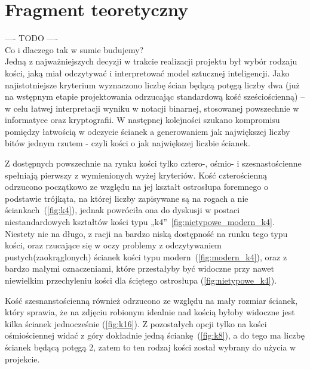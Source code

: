 \chapter{Fragment teoretyczny}\label{ch:fragment-teoretyczny}

---- TODO ---- \\

Co i dlaczego tak w sumie budujemy? \\

Jedną z najważniejszych decyzji w trakcie realizacji projektu był wybór rodzaju kości, jaką miał odczytywać 
i interpretować model sztucznej inteligencji.
Jako najistotniejsze kryterium wyznaczono liczbę ścian będącą potęgą liczby dwa
(już na wstępnym etapie projektowania odrzucając standardową kość sześciościenną) --
w celu łatwej interpretacji wyniku w notacji binarnej, stosowanej powszechnie w informatyce oraz kryptografii.
W następnej kolejności szukano kompromisu pomiędzy łatwością w odczycie ścianek a generowaniem jak największej liczby
bitów jednym rzutem - czyli kości o jak największej liczbie ścianek. 

Z dostępnych powszechnie na rynku kości tylko cztero-, ośmio- i szesnastościenne spełniają pierwszy z wymienionych wyżej kryteriów.
Kość czterościenną odrzucono początkowo ze względu na jej kształt ostrosłupa foremnego o podstawie trójkąta,
na której liczby zapisywane są na rogach a nie ściankach~(\ref{fig:k4}),
jednak powróciła ona do dyskusji w postaci niestandardowych kształtów kości typu „k4”~\ref{fig:nietypowe_modern_k4}.
Niestety nie na długo, z racji na bardzo niską dostępność na runku tego typu kości, oraz rzucające się w oczy problemy
z odczytywaniem pustych(zaokrąglonych) ścianek kości typu modern~(\ref{fig:modern_k4}),
oraz z bardzo małymi oznaczeniami, które przestałyby być widoczne przy nawet niewielkim przechyleniu kości
dla ściętego ostrosłupa (\ref{fig:nietypowe_k4}).

Kość szesnanstościenną również odrzucono ze względu na mały rozmiar ścianek, który sprawia,
że na zdjęciu robionym idealnie nad kością byłoby widoczne jest kilka ścianek jednocześnie (\ref{fig:k16}).
Z pozostałych opcji tylko na kości ośmiościennej widać z góry dokładnie jedną ściankę~(\ref{fig:k8}), a do tego ma liczbę ścianek będącą potęgą 2,
zatem to ten rodzaj kości został wybrany do użycia w projekcie.

